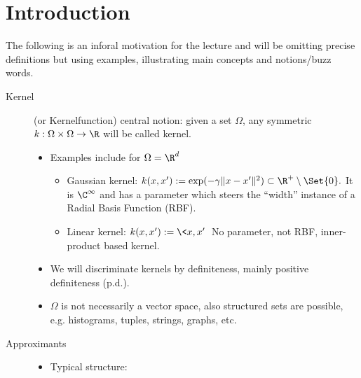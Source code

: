 \chapter{Introduction}


The following is an inforal motivation for the lecture and will be omitting precise definitions but using examples, illustrating main concepts and notions/buzz words.

\begin{description}
    \item[Kernel]
        (or Kernelfunction) central notion: given a set $\Omega$, any symmetric $k: \Omega \times \Omega \to \R$ will be called kernel.
        \begin{itemize}
            \item
                Examples include for $\Omega = \R^d$
                \begin{itemize}
                    \item
                        Gaussian kernel:
                        \begin{math}
                            k(x,x') := \exp(-\gamma \|x-x'\|^2) \subset \R^+ \setminus \Set{0}.
                        \end{math}
                        It is $\C^\infty$ and has a parameter which steers the “width” instance of a Radial Basis Function (RBF).
                    \item
                        Linear kernel:
                        \begin{math}
                            k(x,x') := \<x,x'\>
                        \end{math}
                        No parameter, not RBF, inner-product based kernel.
                \end{itemize}
            \item
                We will discriminate kernels by definiteness, mainly positive definiteness (p.d.).
            \item
                $\Omega$ is not necessarily a vector space, also structured sets are possible, e.g. histograms, tuples, strings, graphs, etc.
        \end{itemize}
    \item[Approximants]
        \begin{itemize}
            \item
                Typical structure:
                \begin{math}

\end{math}
\end{itemize}
\end{description}
